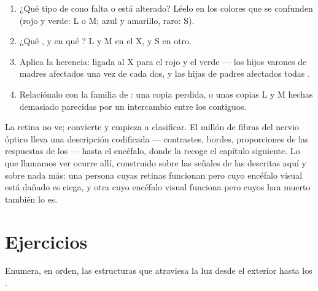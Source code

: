 \begin{method}\label{met:g11:the-eye:case}
\begin{enumerate}
  \item ¿Qué tipo de cono falta o está alterado? Léelo en los colores
        que se confunden (rojo y verde: L o M; azul y amarillo, raro:
        S).
  \item ¿Qué , y en qué ? L y M en el X, y S en otro.
  \item Aplica la herencia:  ligada al X para el rojo y el
        verde --- los hijos varones de madres  afectados una
        vez de cada dos, y las hijas de padres afectados todas
        .
  \item Relaciónalo con la familia de : una copia perdida, o unas
        copias L y M hechas demasiado parecidas por un intercambio
        entre los  contiguos.
\end{enumerate}
\end{method}

\begin{remark}\label{rem:g11:the-eye:tobrain}
La retina no ve; convierte y empieza a clasificar. El millón de fibras
del nervio óptico lleva una descripción codificada --- contrastes,
bordes, proporciones de las respuestas de los  --- hasta el
encéfalo, donde la recoge el capítulo siguiente. Lo que llamamos ver
ocurre allí, construido sobre las señales de las  descritas aquí
y sobre nada más: una persona cuyas retinas funcionan pero cuyo
encéfalo visual está dañado es ciega, y otra cuyo encéfalo visual
funciona pero cuyos  han muerto también lo es.
\end{remark}

\section{Ejercicios}

\begin{exercise}[$\star$]\label{exo:g11:the-eye:1}
Enumera, en orden, las estructuras que atraviesa la luz desde el
exterior hasta los .
\end{exercise}

